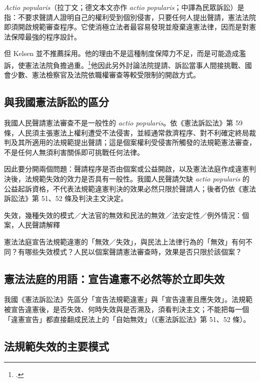 \emph{Actio popularis}（拉丁文；德文本文亦作 \emph{actio popularis}；中譯為民眾訴訟）是指：不要求聲請人證明自己的權利受到個別侵害，只要任何人提出聲請，憲法法院即須開啟規範審查程序。它使消極立法者最容易發現並廢棄違憲法律，因而是對憲法保障最強的程序設計。

但 Kelsen 並不推薦採用。他的理由不是這種制度保障力不足，而是可能造成濫訴，使憲法法院負擔過重。\footcites[64--65]{kelsen2015}[74]{kelsen1929}他因此另外討論法院提請、訴訟當事人間接挑戰、國會少數、憲法檢察官及法院依職權審查等較受限制的開啟方式。

\subsection{與我國憲法訴訟的區分}

我國人民聲請憲法審查不是一般性的 \emph{actio popularis}。依《憲法訴訟法》第 59 條，人民須主張憲法上權利遭受不法侵害，並經通常救濟程序、對不利確定終局裁判及其所適用的法規範提出聲請；這是個案權利受侵害所觸發的法規範憲法審查，不是任何人無須利害關係即可挑戰任何法律。

因此要分開兩個問題：聲請程序是否由個案或公益開啟，以及憲法法庭作成違憲判決後，法規範失效的效力是否具有一般性。我國人民聲請欠缺 \emph{actio popularis} 的公益起訴資格，不代表法規範違憲判決的效果必然只限於聲請人；後者仍依《憲法訴訟法》第 51、52 條及判決主文決定。


\begin{qaprompt}
失效，幾種失效的模式／大法官的無效和民法的無效／法安定性／例外情況：個案，人民聲請解釋
\end{qaprompt}

\begin{qaquestion}
憲法法庭宣告法規範違憲的「無效／失效」，與民法上法律行為的「無效」有何不同？有哪些失效模式？人民以個案聲請憲法審查時，效果是否只限於該個案？
\end{qaquestion}

\subsection{憲法法庭的用語：宣告違憲不必然等於立即失效}

我國《憲法訴訟法》先區分「宣告法規範違憲」與「宣告違憲且應失效」。法規範被宣告違憲後，是否失效、何時失效與是否溯及，須看判決主文；不能把每一個「違憲宣告」都直接翻成民法上的「自始無效」（《憲法訴訟法》第 51、52 條）。

\subsection{法規範失效的主要模式}

